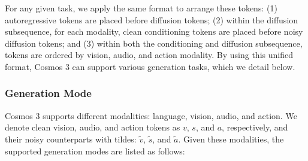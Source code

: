\documentclass{llmxive}
\providecommand{\vidvar}{v}
\providecommand{\actvar}{a}
\providecommand{\audiovar}{s}
\providecommand{\vidtok}{\vidvar}
\providecommand{\acttok}{\actvar}
\providecommand{\audiotok}{\audiovar}
\providecommand{\noisyvidvar}{\tilde{\vidvar}}
\providecommand{\noisyactvar}{\tilde{\actvar}}
\providecommand{\noisyaudiovar}{\tilde{\audiovar}}
\providecommand{\noisyvidtok}{\noisyvidvar}
\providecommand{\noisyacttok}{\noisyactvar}
\providecommand{\noisyaudiotok}{\noisyaudiovar}
\begin{document}
For any given task, we apply the same format to arrange these tokens: (1) autoregressive tokens are placed before diffusion tokens; (2) within the diffusion subsequence, for each modality, clean conditioning tokens are placed before noisy diffusion tokens; and (3) within both the conditioning and diffusion subsequence, tokens are ordered by vision, audio, and action modality.
By using this unified format, Cosmos 3 can support various generation tasks, which we detail below.


\subsubsection{Generation Mode}
\label{sec::generation_mode_def}

Cosmos 3 supports different modalities: language, vision, audio, and action.
We denote clean vision, audio, and action tokens as $\vidtok$, $\audiotok$, and $\acttok$, respectively, and their noisy counterparts with tildes: $\noisyvidtok$, $\noisyaudiotok$, and $\noisyacttok$.
Given these modalities, the supported generation modes are listed as follows:
\end{document}
